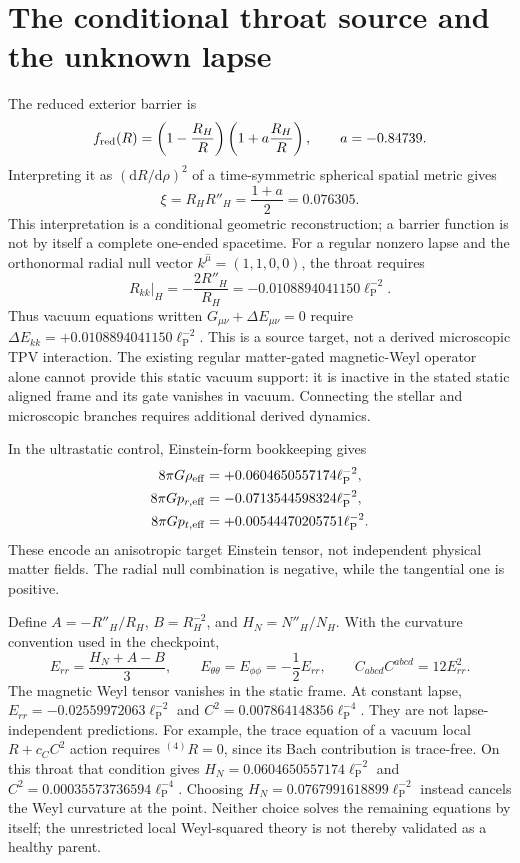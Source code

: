 \documentclass[11pt,oneside]{report}
\newcommand{\dd}{\mathrm d}
\newcommand{\lp}{\ell_{\mathrm P}}
\begin{document}
\section{The conditional throat source and the unknown lapse}
\label{sec:throat-source}
The reduced exterior barrier is
\begin{equation}
f_{\rm red}(R)=\left(1-\frac{R_H}{R}\right)
\left(1+a\frac{R_H}{R}\right),\qquad a=-0.84739.
\end{equation}
Interpreting it as $(\dd R/\dd\rho)^2$ of a time-symmetric spherical spatial metric gives
\begin{equation}
\xi=R_H R''_H=\frac{1+a}{2}=0.076305.
\end{equation}
This interpretation is a conditional geometric reconstruction; a barrier function is not by itself a complete one-ended spacetime. For a regular nonzero lapse and the orthonormal radial null vector $k^{\hat\mu}=(1,1,0,0)$, the throat requires
\begin{equation}
R_{kk}|_H=-\frac{2R''_H}{R_H}=-0.0108894041150\lp^{-2}.
\end{equation}
Thus vacuum equations written $G_{\mu\nu}+\Delta E_{\mu\nu}=0$ require $\Delta E_{kk}=+0.0108894041150\lp^{-2}$. This is a source target, not a derived microscopic TPV interaction. The existing regular matter-gated magnetic-Weyl operator alone cannot provide this static vacuum support: it is inactive in the stated static aligned frame and its gate vanishes in vacuum. Connecting the stellar and microscopic branches requires additional derived dynamics.

In the ultrastatic control, Einstein-form bookkeeping gives
\begin{align}
8\pi G\rho_{\rm eff}&=+0.0604650557174\lp^{-2},\\
8\pi Gp_{r,\rm eff}&=-0.0713544598324\lp^{-2},\\
8\pi Gp_{t,\rm eff}&=+0.00544470205751\lp^{-2}.
\end{align}
These encode an anisotropic target Einstein tensor, not independent physical matter fields. The radial null combination is negative, while the tangential one is positive.

Define $A=-R''_H/R_H$, $B=R_H^{-2}$, and $H_N=N''_H/N_H$. With the curvature convention used in the checkpoint,
\begin{equation}
E_{rr}=\frac{H_N+A-B}{3},\qquad
E_{\theta\theta}=E_{\phi\phi}=-\frac12 E_{rr},\qquad
C_{abcd}C^{abcd}=12E_{rr}^2.
\end{equation}
The magnetic Weyl tensor vanishes in the static frame. At constant lapse, $E_{rr}=-0.02559972063\lp^{-2}$ and $C^2=0.007864148356\lp^{-4}$. They are not lapse-independent predictions. For example, the trace equation of a vacuum local $R+c_C C^2$ action requires ${}^{(4)}R=0$, since its Bach contribution is trace-free. On this throat that condition gives $H_N=0.0604650557174\lp^{-2}$ and $C^2=0.00035573736594\lp^{-4}$. Choosing $H_N=0.0767991618899\lp^{-2}$ instead cancels the Weyl curvature at the point. Neither choice solves the remaining equations by itself; the unrestricted local Weyl-squared theory is not thereby validated as a healthy parent.
\end{document}
